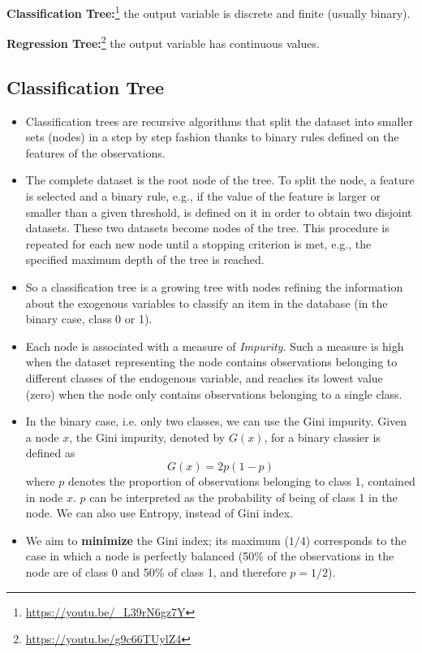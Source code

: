 \textbf{Classification Tree:}\footnote{\url{https://youtu.be/_L39rN6gz7Y}} the output variable is discrete and finite (usually binary).

\textbf{Regression Tree:}\footnote{\url{https://youtu.be/g9c66TUylZ4}} the output variable has continuous values.

\subsection{Classification Tree}

\begin{itemize}
    \item Classification trees are recursive algorithms that split the dataset into smaller sets (nodes) in a step by step fashion thanks to binary rules defined on the features of the observations. 
    \item The complete dataset is the root node of the tree. To split the node, a feature is selected and a binary rule, e.g., if the value of the feature is larger or smaller than a given threshold, is defined on it in order to obtain two disjoint datasets. These two datasets become nodes of the tree. This procedure is repeated for each new node until a stopping criterion is met, e.g., the specified maximum depth of the tree is reached. 
    \item So a classification tree is a growing tree with nodes refining the information about the exogenous variables to classify an item in the database (in the binary case, class 0 or 1). 
    \item Each node is associated with a measure of \textit{Impurity}. Such a measure is high when the dataset representing the node contains observations belonging to different classes of the endogenous variable, and reaches its lowest value (zero) when the node only contains observations belonging to a single class.
    \item In the binary case, i.e. only two classes, we can use the Gini impurity. Given a node $x$, the Gini impurity, denoted by $G(x)$, for a binary classier is defined as
    \begin{equation*}
        G(x) = 2p(1-p)
    \end{equation*}
    where $p$ denotes the proportion of observations belonging to class 1, contained in node $x$. $p$ can be interpreted as the probability of being of class 1 in the node. We can also use Entropy, instead of Gini index.
    \item We aim to \textbf{minimize} the Gini index; its maximum ($1/4$) corresponds to the case in which a node is perfectly balanced (50\% of the observations in the node are of class 0 and 50\% of class 1, and therefore $p=1/2$).

\end{itemize}
